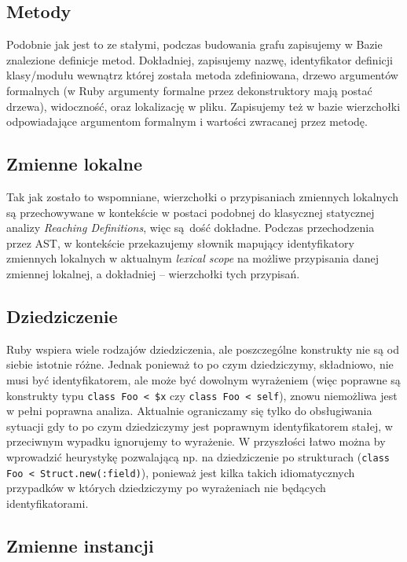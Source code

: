 \documentclass[declaration,shortabstract]{iithesis}
\begin{document}
\subsection{Metody}

Podobnie jak jest to ze stałymi, podczas budowania grafu zapisujemy w Bazie znalezione definicje metod. Dokładniej, zapisujemy nazwę, identyfikator definicji klasy/modułu wewnątrz której została metoda zdefiniowana, drzewo argumentów formalnych (w Ruby argumenty formalne przez dekonstruktory mają postać drzewa), widoczność, oraz lokalizację w pliku. Zapisujemy też w bazie wierzchołki odpowiadające argumentom formalnym i wartości zwracanej przez metodę.

\subsection{Zmienne lokalne}

Tak jak zostało to wspomniane, wierzchołki o przypisaniach zmiennych lokalnych są przechowywane w kontekście w postaci podobnej do klasycznej statycznej analizy \textit{Reaching Definitions}, więc są dość dokładne. Podczas przechodzenia przez AST, w kontekście przekazujemy słownik mapujący identyfikatory zmiennych lokalnych w aktualnym \textit{lexical scope} na możliwe przypisania danej zmiennej lokalnej, a dokładniej -- wierzchołki tych przypisań.

\subsection{Dziedziczenie}

Ruby wspiera wiele rodzajów dziedziczenia, ale poszczególne konstrukty nie są od siebie istotnie różne. Jednak ponieważ to po czym dziedziczymy, składniowo, nie musi być identyfikatorem, ale może być dowolnym wyrażeniem (więc poprawne są konstrukty typu \texttt{class Foo < \$x} czy \texttt{class Foo < self}), znowu niemożliwa jest w pełni poprawna analiza. Aktualnie ograniczamy się tylko do obsługiwania sytuacji gdy to po czym dziedziczymy jest poprawnym identyfikatorem stałej, w przeciwnym wypadku ignorujemy to wyrażenie. W przyszłości łatwo można by wprowadzić heurystykę pozwalającą np. na dziedziczenie po strukturach (\texttt{class Foo < Struct.new(:field)}), ponieważ jest kilka takich idiomatycznych przypadków w których dziedziczymy po wyrażeniach nie będących identyfikatorami.

\subsection{Zmienne instancji}
\end{document}
